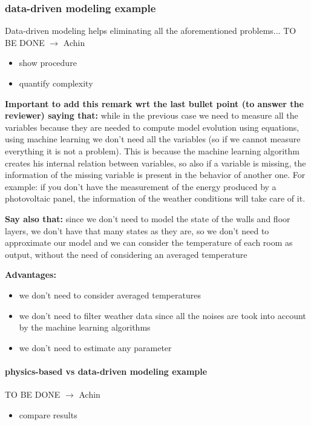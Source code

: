 \subsubsection{data-driven modeling example}
\textcolor[rgb]{0,0,1}{Data-driven modeling helps eliminating all the aforementioned problems...}
TO BE DONE $\rightarrow$ \textcolor[rgb]{0,0,1}{Achin}
\begin{itemize}
	\item show procedure
	\item quantify complexity
\end{itemize}


\textcolor[rgb]{0,0,1}{\textbf{Important to add this remark wrt the last bullet point (to answer the reviewer) saying that:} while in the previous case we need to measure all the variables because they are needed to compute model evolution using equations, using machine learning we don't need all the variables (so if we cannot measure everything it is not a problem). This is because the machine learning algorithm creates his internal relation between variables, so also if a variable is missing, the information of the missing variable is present in the behavior of another one. For example: if you don't have the measurement of the energy produced by a photovoltaic panel, the information of the weather conditions will take care of it.}

\textcolor[rgb]{0,0,1}{\textbf{Say also that:} since we don't need to model the state of the walls and floor layers, we don't have that many states as they are, so we don't need to approximate our model and we can consider the temperature of each room as output, without the need of considering an averaged temperature}

\textcolor[rgb]{0,0,1}{\textbf{Advantages:}
\begin{itemize}
	\item we don't need to consider averaged temperatures
	\item we don't need to filter weather data since all the noises are took into account by the machine learning algorithms
	\item we don't need to estimate any parameter
\end{itemize}}

\paragraph{physics-based vs data-driven modeling example}
TO BE DONE $\rightarrow$ \textcolor[rgb]{0,0,1}{Achin}
\begin{itemize}
	\item compare results
\end{itemize}

